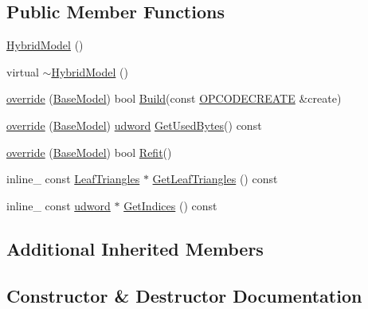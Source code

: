 \subsection*{Public Member Functions}
\begin{DoxyCompactItemize}
\item 
\hyperlink{classOpcode_1_1HybridModel_a491e0cdf0550d09199ae2f0830588f36}{Hybrid\+Model} ()
\item 
virtual \hyperlink{classOpcode_1_1HybridModel_a68349a092c538c0a3e58ce455f273f6d}{$\sim$\+Hybrid\+Model} ()
\item 
\hyperlink{classOpcode_1_1HybridModel_ad23994e63a43035ef35fc511af2ff9bc}{override} (\hyperlink{classOpcode_1_1BaseModel}{Base\+Model}) bool \hyperlink{classOpcode_1_1BaseModel_aa6d81288c9a60ffb1866d60ef2af3c2d}{Build}(const \hyperlink{structOpcode_1_1OPCODECREATE}{O\+P\+C\+O\+D\+E\+C\+R\+E\+A\+TE} \&create)
\item 
\hyperlink{classOpcode_1_1HybridModel_a4683b55ca8506f4d95dfead05cd27045}{override} (\hyperlink{classOpcode_1_1BaseModel}{Base\+Model}) \hyperlink{IceTypes_8h_a44c6f1920ba5551225fb534f9d1a1733}{udword} \hyperlink{classOpcode_1_1BaseModel_a98e9f8effab91a773edb478347acdb54}{Get\+Used\+Bytes}() const 
\item 
\hyperlink{classOpcode_1_1HybridModel_aeeac9b848dce4e06e42546f2bc86b8e8}{override} (\hyperlink{classOpcode_1_1BaseModel}{Base\+Model}) bool \hyperlink{classOpcode_1_1BaseModel_a930a22828bbcab033ac73d2e2ead3ba4}{Refit}()
\item 
inline\+\_\+ const \hyperlink{structOpcode_1_1LeafTriangles}{Leaf\+Triangles} $\ast$ \hyperlink{classOpcode_1_1HybridModel_a7dc9d3d7849855af0927e02f8b8b3f9d}{Get\+Leaf\+Triangles} () const 
\item 
inline\+\_\+ const \hyperlink{IceTypes_8h_a44c6f1920ba5551225fb534f9d1a1733}{udword} $\ast$ \hyperlink{classOpcode_1_1HybridModel_aa8dce457524dbaae425ab5fed349777e}{Get\+Indices} () const 
\end{DoxyCompactItemize}
\subsection*{Additional Inherited Members}


\subsection{Constructor \& Destructor Documentation}
